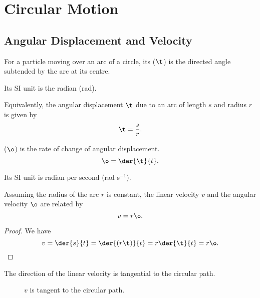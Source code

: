 \chapter{Circular Motion}

\section{Angular Displacement and Velocity}

\begin{definition}
    For a particle moving over an arc of a circle, its  ($\t$) is the directed angle subtended by the arc at its centre.
\end{definition}

Its SI unit is the radian (rad).

Equivalently, the angular displacement $\t$ due to an arc of length $s$ and radius $r$ is given by \[\t = \frac{s}{r}.\]

\begin{definition}
     ($\o$) is the rate of change of angular displacement. \[\o = \der{\t}{t}.\]
\end{definition}

Its SI unit is radian per second (rad s$^{-1}$).

\begin{proposition}
    Assuming the radius of the arc $r$ is constant, the linear velocity $v$ and the angular velocity $\o$ are related by \[v = r \o.\]
\end{proposition}
\begin{proof}
    We have \[v = \der{s}{t} = \der{(r \t)}{t} = r \der{\t}{t} = r\o.\]
\end{proof}

The direction of the linear velocity is tangential to the circular path.

\begin{figure}[H]
    \centering
    \caption{$v$ is tangent to the circular path.}
\end{figure}

